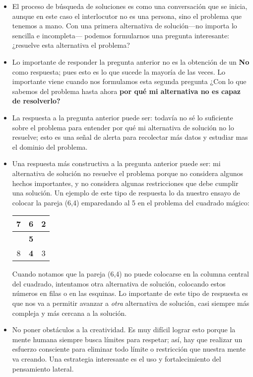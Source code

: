 \begin{itemize}
	\item El proceso de búsqueda de soluciones es como una conversación que se 
	inicia, aunque en este caso el interlocutor no es una persona, sino el 
	problema que tenemos a mano. 
	Con una primera alternativa de solución---no importa lo sencilla e 
	incompleta--- podemos formularnos una pregunta interesante: ¿resuelve esta 
	alternativa el problema?
	
	\item Lo importante de responder la pregunta anterior no es la obtención de 
	un {\bf No} como respuesta; pues esto es lo que sucede la mayoría de las 
	veces. Lo importante viene cuando nos formulamos esta segunda pregunta ¿Con 
	lo que sabemos del problema hasta ahora {\bf por qué mi alternativa no es 
	capaz de resolverlo?} 
	
	\item La respuesta a la pregunta anterior puede ser: todavía no sé lo 
	suficiente sobre el problema para entender por qué mi alternativa de 
	solución no lo resuelve; esto es una señal de alerta para recolectar más 
	datos y estudiar mas el dominio	del problema.
	
	\item Una respuesta más constructiva a la pregunta anterior puede ser: mi 
	alternativa de solución no resuelve el problema porque no considera algunos 
	hechos importantes,	y no considera algunas restricciones que debe cumplir 
	una solución. Un ejemplo de	este tipo de respuesta lo da nuestro ensayo 
	de colocar la pareja (6,4) emparedando al 5 en el problema del cuadrado 
	mágico:
	
	\begin{center}
		\begin{tabular}{|c|c|c|}
			\hline 
			 7 & {\bf 6} & 2\tabularnewline
			\hline
			  & {\bf 5} & \tabularnewline
			\hline 
			 8 & {\bf 4} & 3 \tabularnewline
			\hline
		\end{tabular}
	\end{center}
	
	Cuando notamos que la pareja (6,4) no puede colocarse en la columna central 
	del cuadrado, intentamos otra alternativa de solución, colocando estos
	números en filas o en las esquinas. Lo importante de este tipo de respuesta
	es que nos va a permitir avanzar a {\em otra} alternativa de solución, casi
	siempre más compleja y más cercana a la solución.
	
	\item No poner obstáculos a la creatividad. Es muy difícil lograr esto 
	porque la mente humana siempre busca límites para respetar; así, hay que 
	realizar un esfuerzo consciente para eliminar todo límite o restricción que 
	nuestra mente va creando. Una estrategia interesante es el uso y 
	fortalecimiento del pensamiento lateral.
	

\end{itemize}
